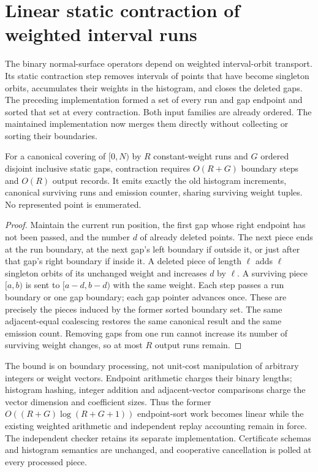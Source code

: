 \section{Linear static contraction of weighted interval runs}
\label{sec:weighted-sweep}

The binary normal-surface operators depend on weighted interval-orbit
transport. Its static contraction step removes intervals of points that
have become singleton orbits, accumulates their weights in the histogram,
and closes the deleted gaps. The preceding implementation formed a set
of every run and gap endpoint and sorted that set at every contraction.
Both input families are already ordered. The maintained implementation
now merges them directly without collecting or sorting their boundaries.

\begin{proposition}
For a canonical covering of $[0,N)$ by $R$ constant-weight runs and $G$
ordered disjoint inclusive static gaps, contraction requires $O(R+G)$
boundary steps and $O(R)$ output records. It emits exactly the old histogram
increments, canonical surviving runs and emission counter, sharing surviving
weight tuples. No represented point is enumerated.
\end{proposition}
\begin{proof}
Maintain the current run position, the first gap whose right endpoint has
not been passed, and the number $d$ of already deleted points. The next
piece ends at the run boundary, at the next gap's left boundary if outside
it, or just after that gap's right boundary if inside it. A deleted piece
of length $\ell$ adds $\ell$ singleton orbits of its unchanged weight and
increases $d$ by $\ell$. A surviving piece $[a,b)$ is sent to
$[a-d,b-d)$ with the same weight. Each step passes a run boundary or one
gap boundary; each gap pointer advances once. These are precisely the
pieces induced by the former sorted boundary set. The same adjacent-equal
coalescing restores the same canonical result and the same emission count.
Removing gaps from one run cannot increase its number of surviving weight
changes, so at most $R$ output runs remain.
\end{proof}

The bound is on boundary processing, not unit-cost manipulation of arbitrary
integers or weight vectors. Endpoint arithmetic charges their binary lengths;
histogram hashing, integer addition and adjacent-vector comparisons charge
the vector dimension and coefficient sizes. Thus the former
$O((R+G)\log(R+G+1))$ endpoint-sort work becomes linear while the existing
weighted arithmetic and independent replay accounting remain in force.
The independent checker retains its separate implementation. Certificate
schemas and histogram semantics are unchanged, and cooperative cancellation
is polled at every processed piece.

